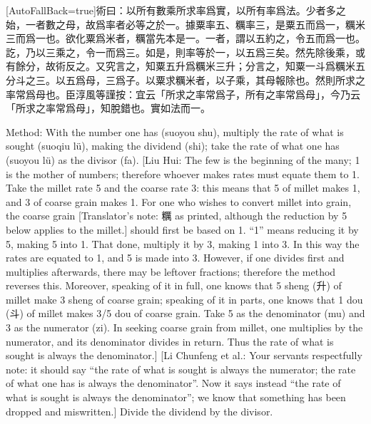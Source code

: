\documentclass[11pt]{article}
\newcommand{\zhsmall}{\footnotesize\color{black!70}}
\newcommand{\unitlabel}[1]{\marginpar{\raggedleft\tiny\color{gray}#1}}
\newenvironment{unitzh}{\par\CJKfontspec{Noto Serif CJK SC}[AutoFallBack=true]\large\linespread{1.25}\selectfont}{\par}
\newenvironment{uniten}{\par\small\color{black!85}}{\par\medskip}
\begin{document}
\begin{unitzh}\unitlabel{jiuzhang-008.5}術曰：以所有數乘所求率爲實，以所有率爲法。{\zhsmall 少者多之始，一者數之母，故爲率者必等之於一。據粟率五、糲率三，是粟五而爲一，糲米三而爲一也。欲化粟爲米者，糲當先本是一。一者，謂以五約之，令五而爲一也。訖，乃以三乘之，令一而爲三。如是，則率等於一，以五爲三矣。然先除後乘，或有餘分，故術反之。又究言之，知粟五升爲糲米三升；分言之，知粟一斗爲糲米五分斗之三。以五爲母，三爲子。以粟求糲米者，以子乘，其母報除也。然則所求之率常爲母也。臣淳風等謹按：宜云「所求之率常爲子，所有之率常爲母」，今乃云「所求之率常爲母」，知脫錯也。}實如法而一。\end{unitzh}
\begin{uniten}Method: With the number one has (suoyou shu), multiply the rate of what is sought (suoqiu lü), making the dividend (shi); take the rate of what one has (suoyou lü) as the divisor (fa). [Liu Hui: The few is the beginning of the many; 1 is the mother of numbers; therefore whoever makes rates must equate them to 1. Take the millet rate 5 and the coarse rate 3: this means that 5 of millet makes 1, and 3 of coarse grain makes 1. For one who wishes to convert millet into grain, the coarse grain [Translator's note: 糲 as printed, although the reduction by 5 below applies to the millet.] should first be based on 1. “1” means reducing it by 5, making 5 into 1. That done, multiply it by 3, making 1 into 3. In this way the rates are equated to 1, and 5 is made into 3. However, if one divides first and multiplies afterwards, there may be leftover fractions; therefore the method reverses this. Moreover, speaking of it in full, one knows that 5 sheng (升) of millet make 3 sheng of coarse grain; speaking of it in parts, one knows that 1 dou (斗) of millet makes 3/5 dou of coarse grain. Take 5 as the denominator (mu) and 3 as the numerator (zi). In seeking coarse grain from millet, one multiplies by the numerator, and its denominator divides in return. Thus the rate of what is sought is always the denominator.] [Li Chunfeng et al.: Your servants respectfully note: it should say “the rate of what is sought is always the numerator; the rate of what one has is always the denominator”. Now it says instead “the rate of what is sought is always the denominator”; we know that something has been dropped and miswritten.] Divide the dividend by the divisor.\end{uniten}
\end{document}
